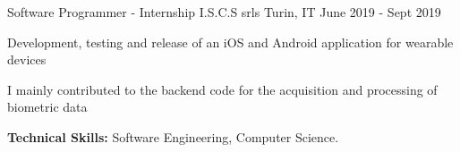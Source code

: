\begin{cventries}
  \cventry
    {Software Programmer - Internship} %
    {I.S.C.S srls} %
    {Turin, IT} %
    {June 2019 - Sept 2019} %
    {
      \begin{cvitems} %
        \item {Development, testing and release of an iOS and Android application for wearable devices}
        \item {I mainly contributed to the backend code for the acquisition and processing of biometric data}
        \item {\textbf{Technical Skills:} Software Engineering, Computer Science.}
      \end{cvitems}
    }

\end{cventries}

